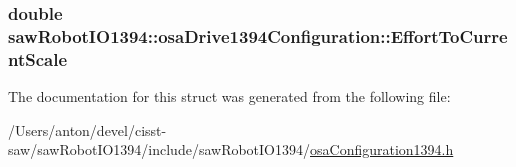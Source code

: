 \subsubsection[{Effort\+To\+Current\+Scale}]{\setlength{\rightskip}{0pt plus 5cm}double saw\+Robot\+I\+O1394\+::osa\+Drive1394\+Configuration\+::\+Effort\+To\+Current\+Scale}\label{structsaw_robot_i_o1394_1_1osa_drive1394_configuration_a8b80905fd42053724c4472214064331d}


The documentation for this struct was generated from the following file\+:\begin{DoxyCompactItemize}
\item 
/\+Users/anton/devel/cisst-\/saw/saw\+Robot\+I\+O1394/include/saw\+Robot\+I\+O1394/\hyperlink{osa_configuration1394_8h}{osa\+Configuration1394.\+h}\end{DoxyCompactItemize}
